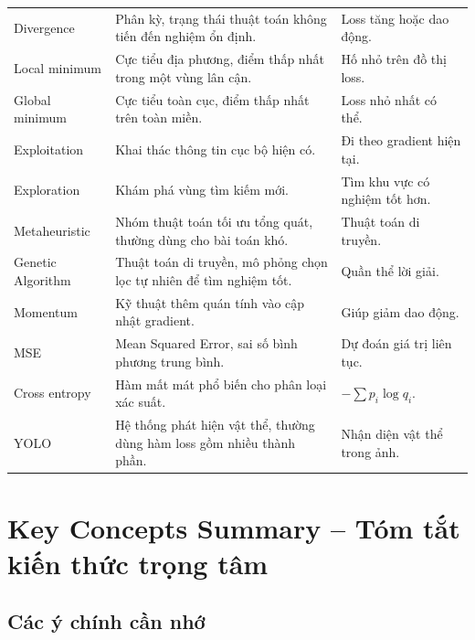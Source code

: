 \begin{longtable}{p{}p{}p{}}
Divergence & Phân kỳ, trạng thái thuật toán không tiến đến nghiệm ổn định. & Loss tăng hoặc dao động. \\

Local minimum & Cực tiểu địa phương, điểm thấp nhất trong một vùng lân cận. & Hố nhỏ trên đồ thị loss. \\

Global minimum & Cực tiểu toàn cục, điểm thấp nhất trên toàn miền. & Loss nhỏ nhất có thể. \\

Exploitation & Khai thác thông tin cục bộ hiện có. & Đi theo gradient hiện tại. \\

Exploration & Khám phá vùng tìm kiếm mới. & Tìm khu vực có nghiệm tốt hơn. \\

Metaheuristic & Nhóm thuật toán tối ưu tổng quát, thường dùng cho bài toán khó. & Thuật toán di truyền. \\

Genetic Algorithm & Thuật toán di truyền, mô phỏng chọn lọc tự nhiên để tìm nghiệm tốt. & Quần thể lời giải. \\

Momentum & Kỹ thuật thêm quán tính vào cập nhật gradient. & Giúp giảm dao động. \\

MSE & Mean Squared Error, sai số bình phương trung bình. & Dự đoán giá trị liên tục. \\

Cross entropy & Hàm mất mát phổ biến cho phân loại xác suất. & $-\sum p_i\log q_i$. \\

YOLO & Hệ thống phát hiện vật thể, thường dùng hàm loss gồm nhiều thành phần. & Nhận diện vật thể trong ảnh. \\

\bottomrule
\end{longtable}
\normalsize

\section{Key Concepts Summary -- Tóm tắt kiến thức trọng tâm}

\subsection{Các ý chính cần nhớ}

